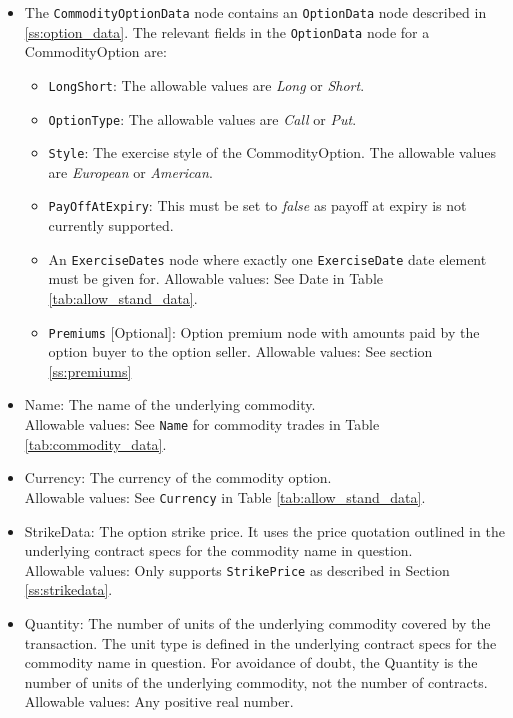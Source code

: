 \begin{itemize}

\item The \lstinline!CommodityOptionData! node contains an \lstinline!OptionData! node described in \ref{ss:option_data}. The relevant fields in the \lstinline!OptionData! node for a CommodityOption are:

\begin{itemize}

\item \lstinline!LongShort!: The allowable values are \emph{Long} or \emph{Short}.

\item \lstinline!OptionType!: The allowable values are \emph{Call} or \emph{Put}.

\item  \lstinline!Style!: The exercise style of the CommodityOption. The allowable values are \emph{European} or \emph{American}.

\item  \lstinline!PayOffAtExpiry!:  This must be set to \emph{false} as payoff at expiry is not currently supported.

\item An \lstinline!ExerciseDates! node where exactly one \lstinline!ExerciseDate! date element must be given for. Allowable values: See Date in Table \ref{tab:allow_stand_data}.

\item \lstinline!Premiums! [Optional]: Option premium node with amounts paid by the option buyer to the option seller.
Allowable values:  See section \ref{ss:premiums}

\end{itemize}





\item Name: The name of the underlying commodity. \\
Allowable values: See \lstinline!Name! for commodity trades in Table \ref{tab:commodity_data}.
\item Currency: The currency of the commodity option. \\
Allowable values: See \lstinline!Currency! in Table \ref{tab:allow_stand_data}.
\item StrikeData: The option strike price. It uses the price quotation outlined in the underlying contract specs for the commodity name in question.  \\
Allowable values: Only supports \lstinline!StrikePrice! as described in Section \ref{ss:strikedata}.
\item Quantity: The number of units of the underlying commodity covered by the transaction. The unit type is defined in the underlying contract specs for the commodity name in question. For avoidance of doubt, the Quantity is the number of units of the underlying commodity, not the number of contracts. \\
Allowable values: Any positive real number.


\end{itemize}
